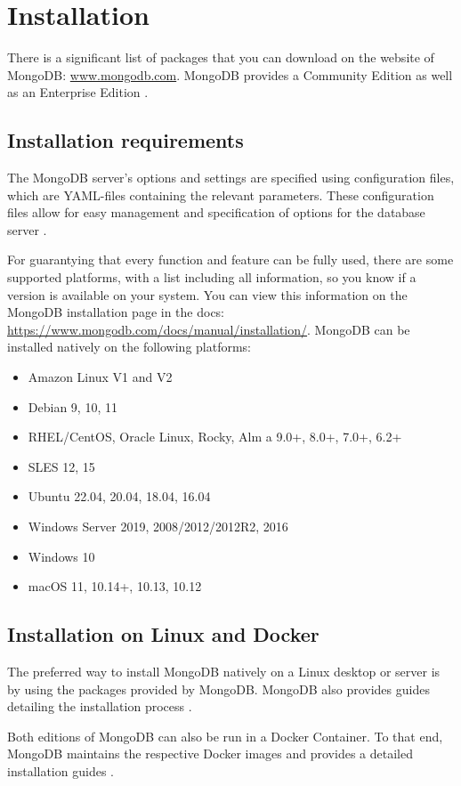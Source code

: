 
\section{Installation}
There is a significant list of packages that you can download on the website of MongoDB: \url{www.mongodb.com}. MongoDB provides a Community Edition as well as an Enterprise Edition \parencite{Mongo-Installation}.

\subsection{Installation requirements}
The MongoDB server's options and settings are specified using configuration files, which are YAML-files containing the relevant parameters. 
These configuration files allow for easy management and specification of options for the database server \parencite{Mongo-configuration}.

For guarantying that every function and feature can be fully used, there are some supported platforms, with a list including all information, so you know if a version is available on your system.
You can view this information on the MongoDB installation page in the docs: \url{https://www.mongodb.com/docs/manual/installation/}.
MongoDB can be installed natively on the following platforms: 
\begin{itemize}
    \item Amazon Linux V1 and V2
    \item Debian 9, 10, 11
    \item RHEL/CentOS, Oracle Linux, Rocky, Alm a 9.0+, 8.0+, 7.0+, 6.2+
    \item SLES 12, 15
    \item Ubuntu 22.04, 20.04, 18.04, 16.04
    \item Windows Server 2019, 2008/2012/2012R2, 2016
    \item Windows 10
    \item macOS 11, 10.14+, 10.13, 10.12
\end{itemize} \parencite{Mongo-Installation}

\subsection{Installation on Linux and Docker}
The preferred way to install MongoDB natively on a Linux desktop or server is by using the packages
provided by MongoDB. MongoDB also provides guides detailing the installation process \parencite{Mongo-linux-Install}.

Both editions of MongoDB can also be run in a Docker Container. To that end, MongoDB maintains the respective Docker images
and provides a detailed installation guides \parencite{Install-Mongo-Docker, Install-Mongo-Docker2}.
